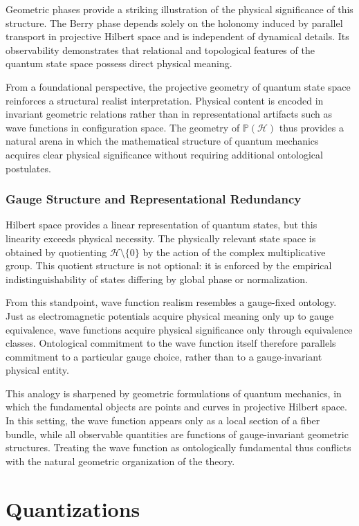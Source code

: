 Geometric phases provide a striking illustration of the physical 
significance of this structure. The Berry phase depends solely on the 
holonomy induced by parallel transport in projective Hilbert space and 
is independent of dynamical details. Its observability demonstrates that 
relational and topological features of the quantum state space possess
direct physical meaning.

From a foundational perspective, the projective geometry of quantum 
state space reinforces a structural realist interpretation. Physical 
content is encoded in invariant geometric relations rather than in 
representational artifacts such as wave functions in configuration space. 
The geometry of $\mathbb{P}(\mathcal{H})$ thus provides a natural arena in
which the mathematical structure of quantum mechanics acquires clear physical
significance without requiring additional ontological postulates.
\subsection*{Gauge Structure and Representational Redundancy}

Hilbert space provides a linear representation of quantum states, 
but this linearity exceeds physical necessity. The physically relevant state
space is obtained by quotienting $\mathcal{H} \setminus \{0\}$ by the action 
of the complex multiplicative group. This quotient structure is not optional:
it is enforced by the empirical indistinguishability of states differing by 
global phase or normalization.

From this standpoint, wave function realism resembles a gauge-fixed ontology. 
Just as electromagnetic potentials acquire physical meaning only up to 
gauge equivalence, wave functions acquire physical significance only through 
equivalence classes. Ontological commitment to the wave function itself therefore 
parallels commitment to a particular gauge choice, 
rather than to a gauge-invariant physical entity.

This analogy is sharpened by geometric formulations of quantum mechanics, 
in which the fundamental objects are points and curves in projective Hilbert
space. In this setting, the wave function appears only as a local section of 
a fiber bundle, while all observable quantities are functions of gauge-invariant
geometric structures. Treating the wave function as ontologically fundamental 
thus conflicts with the natural geometric organization of the theory.

\chapter{Quantizations }
\label{qnt}

